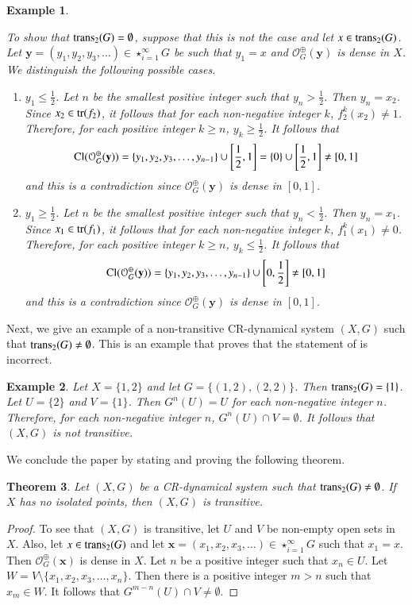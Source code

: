 \documentclass[a4paper,12pt]{article} %
\newcommand{\orbit}{\mathcal{O}^{\oplus}}
\newcommand{\tr}{\textup{tr}}
\newcommand{\trans}{\textup{trans}}
\newtheorem{theorem}{Theorem}[section]
\newtheorem{example}[theorem]{Example}
\newcommand{\Cl}  {\mathop{\rm Cl}\nolimits}
\begin{document}
\begin{example}
\begin{enumerate}
\end{enumerate} 
To show that $\trans_2(G)=\emptyset$, suppose that this is not the case and let $x\in \trans_2(G)$.  Let $\mathbf y=(y_1,y_2,y_3,\ldots)\in \star_{i=1}^{\infty}G$ be such that $y_1=x$ and $\orbit_G(\mathbf y)$ is dense in $X$.  We distinguish the following possible cases.
\begin{enumerate}
\item $y_1\leq \frac{1}{2}$.  Let $n$ be the smallest positive integer such that $y_n>\frac{1}{2}$. Then $y_n=x_2$. Since $x_2\in \tr(f_2)$, it follows that for each non-negative integer $k$, $f_2^k(x_2)\neq 1$.  Therefore, for each positive integer $k\geq n$, $y_k\geq \frac{1}{2}$.  It follows that
$$
\Cl(\orbit_G(\mathbf y))=\{y_1,y_2,y_3,\ldots,y_{n-1}\}\cup \left[\frac{1}{2},1\right]=\{0\}\cup \left[\frac{1}{2},1\right]\neq [0,1]
$$
and this is a contradiction since $\orbit_G(\mathbf y)$ is dense in $[0,1]$. 
\item $y_1\geq \frac{1}{2}$.  Let $n$ be the smallest positive integer such that $y_n<\frac{1}{2}$. Then $y_n=x_1$. Since $x_1\in \tr(f_1)$, it follows that for each non-negative integer $k$, $f_1^k(x_1)\neq 0$.  Therefore, for each positive integer $k\geq n$, $y_k\leq \frac{1}{2}$.  It follows that
$$
\Cl(\orbit_G(\mathbf y))=\{y_1,y_2,y_3,\ldots,y_{n-1}\}\cup \left[0,\frac{1}{2}\right]\neq [0,1]
$$
and this is a contradiction since $\orbit_G(\mathbf y)$ is dense in $[0,1]$. 
\end{enumerate}
\end{example}
Next, we give an example of a non-transitive CR-dynamical system  $(X,G)$ such that  $\trans_2(G)\neq\emptyset$.  This is an example that proves that the statement of  \cite[Proposition 8, page 2]{SS} is incorrect.  
\begin{example}
Let $X=\{1,2\}$ and let $G=\{(1,2),(2,2)\}$. Then $\trans_2(G)=\{1\}$.  Let $U=\{2\}$ and $V=\{1\}$. Then $G^n(U)=U$ for each non-negative integer $n$. Therefore,  for each non-negative integer $n$, $G^n(U)\cap V=\emptyset$.  It follows that $(X,G)$ is not transitive. 
\end{example}
We conclude the paper by stating and proving the following theorem.
\begin{theorem}
Let $(X,G)$ be a CR-dynamical system such that $\trans_2(G)\neq \emptyset$.  If $X$ has no isolated points, then  $(X,G)$ is transitive. 
\end{theorem}
\begin{proof}
To see that $(X,G)$ is transitive, let $U$ and $V$ be non-empty open sets in $X$.  Also, let $x\in \trans_2(G)$ and let $\mathbf x=(x_1,x_2,x_3,\ldots)\in \star_{i=1}^{\infty}G$ such that $x_1=x$. Then $\orbit_G(\mathbf x)$ is dense in $X$.  Let $n$ be a positive integer such that $x_n\in U$.  Let $W=V\setminus\{x_1,x_2,x_3,\ldots ,x_n\}$. Then there is a positive integer $m>n$ such that $x_m\in W$. It follows that $G^{m-n}(U)\cap V\neq \emptyset$.
\end{proof}
\end{document}
